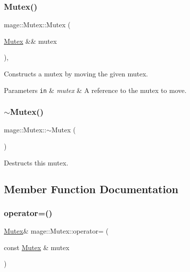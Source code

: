 \subsubsection{\texorpdfstring{Mutex()}{Mutex()}\hspace{0.1cm}{\footnotesize\ttfamily [3/3]}}
{\footnotesize\ttfamily mage\+::\+Mutex\+::\+Mutex (\begin{DoxyParamCaption}\item[{\hyperlink{structmage_1_1_mutex}{Mutex} \&\&}]{mutex }\end{DoxyParamCaption})\hspace{0.3cm}{\ttfamily [default]}, {\ttfamily [noexcept]}}

Constructs a mutex by moving the given mutex.


\begin{DoxyParams}[1]{Parameters}
\mbox{\tt in}  & {\em mutex} & A reference to the mutex to move. \\
\hline
\end{DoxyParams}
\hypertarget{structmage_1_1_mutex_a143d82ec7bb43f953a1703caa7972e9d}{}\label{structmage_1_1_mutex_a143d82ec7bb43f953a1703caa7972e9d} 
\subsubsection{\texorpdfstring{$\sim$\+Mutex()}{~Mutex()}}
{\footnotesize\ttfamily mage\+::\+Mutex\+::$\sim$\+Mutex (\begin{DoxyParamCaption}{ }\end{DoxyParamCaption})}

Destructs this mutex. 

\subsection{Member Function Documentation}
\hypertarget{structmage_1_1_mutex_a56072bdabdeadd5d897de232dbd298a0}{}\label{structmage_1_1_mutex_a56072bdabdeadd5d897de232dbd298a0} 
\subsubsection{\texorpdfstring{operator=()}{operator=()}\hspace{0.1cm}{\footnotesize\ttfamily [1/2]}}
{\footnotesize\ttfamily \hyperlink{structmage_1_1_mutex}{Mutex}\& mage\+::\+Mutex\+::operator= (\begin{DoxyParamCaption}\item[{const \hyperlink{structmage_1_1_mutex}{Mutex} \&}]{mutex }\end{DoxyParamCaption})\hspace{0.3cm}{\ttfamily [delete]}}

